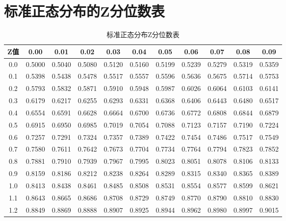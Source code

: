 \documentclass[12pt]{article}
\begin{document}
\section{标准正态分布的Z分位数表}
\begin{table}[H]
    \centering
        \caption{\small 标准正态分布Z分位数表}
        \label{tab:z_table_detailed}
        \begin{tabular}{|c|c|c|c|c|c|c|c|c|c|c|}
            \hline
            Z值 & 0.00 & 0.01 & 0.02 & 0.03 & 0.04 & 0.05 & 0.06 & 0.07 & 0.08 & 0.09 \\ \hline
            0.0 & 0.5000 & 0.5040 & 0.5080 & 0.5120 & 0.5160 & 0.5199 & 0.5239 & 0.5279 & 0.5319 & 0.5359 \\ \hline
            0.1 & 0.5398 & 0.5438 & 0.5478 & 0.5517 & 0.5557 & 0.5596 & 0.5636 & 0.5675 & 0.5714 & 0.5753 \\ \hline
            0.2 & 0.5793 & 0.5832 & 0.5871 & 0.5910 & 0.5948 & 0.5987 & 0.6026 & 0.6064 & 0.6103 & 0.6141 \\ \hline
            0.3 & 0.6179 & 0.6217 & 0.6255 & 0.6293 & 0.6331 & 0.6368 & 0.6406 & 0.6443 & 0.6480 & 0.6517 \\ \hline
            0.4 & 0.6554 & 0.6591 & 0.6628 & 0.6664 & 0.6700 & 0.6736 & 0.6772 & 0.6808 & 0.6844 & 0.6879 \\ \hline
            0.5 & 0.6915 & 0.6950 & 0.6985 & 0.7019 & 0.7054 & 0.7088 & 0.7123 & 0.7157 & 0.7190 & 0.7224 \\ \hline
            0.6 & 0.7257 & 0.7291 & 0.7324 & 0.7357 & 0.7389 & 0.7422 & 0.7454 & 0.7486 & 0.7517 & 0.7549 \\ \hline
            0.7 & 0.7580 & 0.7611 & 0.7642 & 0.7673 & 0.7704 & 0.7734 & 0.7764 & 0.7794 & 0.7823 & 0.7852 \\ \hline
            0.8 & 0.7881 & 0.7910 & 0.7939 & 0.7967 & 0.7995 & 0.8023 & 0.8051 & 0.8078 & 0.8106 & 0.8133 \\ \hline
            0.9 & 0.8159 & 0.8186 & 0.8212 & 0.8238 & 0.8264 & 0.8289 & 0.8315 & 0.8340 & 0.8365 & 0.8389 \\ \hline
            1.0 & 0.8413 & 0.8438 & 0.8461 & 0.8485 & 0.8508 & 0.8531 & 0.8554 & 0.8577 & 0.8599 & 0.8621 \\ \hline
            1.1 & 0.8643 & 0.8665 & 0.8686 & 0.8708 & 0.8729 & 0.8749 & 0.8770 & 0.8790 & 0.8810 & 0.8830 \\ \hline
            1.2 & 0.8849 & 0.8869 & 0.8888 & 0.8907 & 0.8925 & 0.8944 & 0.8962 & 0.8980 & 0.8997 & 0.9015 \\ \hline

\end{tabular}
\end{table}
\end{document}
